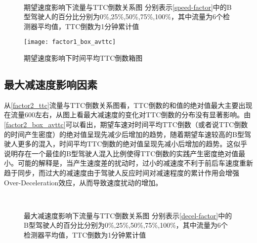 \begin{figure}[H]%
\centering
{}%
\\%
%
\caption[A set of four sub-floats.]{期望速度影响下流量与TTC倒数关系图
分别表示\autoref{speed-factor}中的B型驾驶人的百分比分别为0\%,25\%,50\%,75\%,100\%，其中流量为6个检测器平均值，TTC倒数为1分钟累计值}%
\label{factor1_ttc}%
\end{figure}

\begin{figure}[H]
\begin{center}
\texttt{[image: factor1\_box\_avttc]}
\caption{期望速度影响下时间平均TTC倒数箱图}
\label{factor1_box_avttc}
\end{center}
\end{figure}

\subsection{最大减速度影响因素}

从\autoref{factor2_ttc}流量与TTC倒数关系图看，TTC倒数的和值的绝对值最大主要出现在流量600左右，从图上看最大减速度的变化对TTC倒数的分布没有显著影响。由\autoref{factor2_box_avttc}可以看出，期望车速对时间平均TTC倒数（或者说TTC倒数的时间产生密度）的绝对值呈现先减少后增加的趋势，随着期望车速较高的B型驾驶人更多的混入，时间平均TTC倒数的绝对值呈现先减小后增加的趋势。这似乎说明存在一个最佳的B型驾驶人混入比例使得TTC倒数的实践产生密度绝对值最小。可能的解释是，当产生速度差的扰动时，过小的减速度不利于前后车速度重新趋于同步，而过大的减速度由于驾驶人反应时间对减速程度的累计作用会增强Over-Deceleration效应，从而导致速度扰动的增加。
\begin{figure}[H]%
\centering
{}%
\\%
%
\caption[A set of four sub-floats.]{最大减速度影响下流量与TTC倒数关系图
分别表示\autoref{decel-factor}中的B型驾驶人的百分比分别为0\%,25\%,50\%,75\%,100\%，其中流量为6个检测器平均值，TTC倒数为1分钟累计值}%
\label{factor2_ttc}%
\end{figure}

